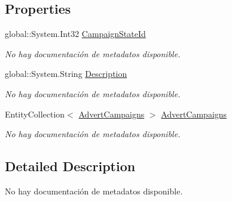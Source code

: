 \subsection*{Properties}
\begin{DoxyCompactItemize}
\item 
global\-::\-System.\-Int32 \hyperlink{class_game_memory_1_1_campaign_states_a601afd4dcdde9340518a610a55469580}{Campaign\-State\-Id}
\begin{DoxyCompactList}\small\item\em No hay documentación de metadatos disponible. \end{DoxyCompactList}\item 
global\-::\-System.\-String \hyperlink{class_game_memory_1_1_campaign_states_a4f99ca8ca1805ffe03998685fae7913c}{Description}
\begin{DoxyCompactList}\small\item\em No hay documentación de metadatos disponible. \end{DoxyCompactList}\item 
Entity\-Collection$<$ \hyperlink{class_game_memory_1_1_advert_campaigns}{Advert\-Campaigns} $>$ \hyperlink{class_game_memory_1_1_campaign_states_a4e6c871f2c55f0e02c9b6242baf6ef5c}{Advert\-Campaigns}
\begin{DoxyCompactList}\small\item\em No hay documentación de metadatos disponible. \end{DoxyCompactList}\end{DoxyCompactItemize}


\subsection{Detailed Description}
No hay documentación de metadatos disponible. 



